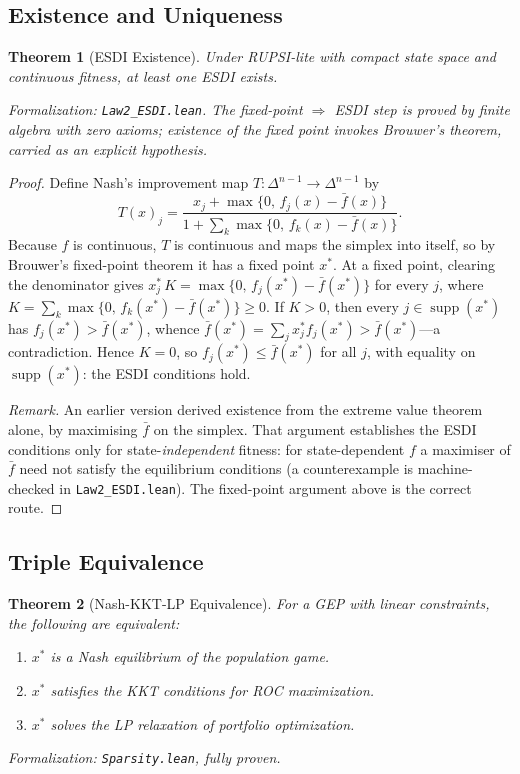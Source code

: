 \documentclass[12pt]{article}
\newtheorem{theorem}{Theorem}[section]
\begin{document}
\subsection{Existence and Uniqueness}

\begin{theorem}[ESDI Existence]
\label{thm:esdi-existence}
Under RUPSI-lite with compact state space and continuous fitness, at least one ESDI exists.
\end{theorem}
\noindent\textit{Formalization: \texttt{Law2\_ESDI.lean}. The fixed-point $\Rightarrow$ ESDI step is proved by finite algebra with zero axioms; existence of the fixed point invokes Brouwer's theorem, carried as an explicit hypothesis.}

\begin{proof}
Define Nash's improvement map $T : \Delta^{n-1} \to \Delta^{n-1}$ by
\[
T(x)_j = \frac{x_j + \max\{0,\, f_j(x) - \bar{f}(x)\}}{1 + \sum_k \max\{0,\, f_k(x) - \bar{f}(x)\}}.
\]
Because $f$ is continuous, $T$ is continuous and maps the simplex into itself, so by Brouwer's fixed-point theorem it has a fixed point $x^*$. At a fixed point, clearing the denominator gives $x^*_j\, K = \max\{0,\, f_j(x^*) - \bar{f}(x^*)\}$ for every $j$, where $K = \sum_k \max\{0,\, f_k(x^*) - \bar{f}(x^*)\} \geq 0$. If $K > 0$, then every $j \in \operatorname{supp}(x^*)$ has $f_j(x^*) > \bar{f}(x^*)$, whence $\bar{f}(x^*) = \sum_j x^*_j f_j(x^*) > \bar{f}(x^*)$---a contradiction. Hence $K = 0$, so $f_j(x^*) \leq \bar{f}(x^*)$ for all $j$, with equality on $\operatorname{supp}(x^*)$: the ESDI conditions hold.

\emph{Remark.} An earlier version derived existence from the extreme value theorem alone, by maximising $\bar{f}$ on the simplex. That argument establishes the ESDI conditions only for state-\emph{independent} fitness: for state-dependent $f$ a maximiser of $\bar{f}$ need not satisfy the equilibrium conditions (a counterexample is machine-checked in \texttt{Law2\_ESDI.lean}). The fixed-point argument above is the correct route.
\end{proof}

\subsection{Triple Equivalence}

\begin{theorem}[Nash-KKT-LP Equivalence]
\label{thm:triple-equivalence}
For a GEP with linear constraints, the following are equivalent:
\begin{enumerate}
    \item $x^*$ is a Nash equilibrium of the population game.
    \item $x^*$ satisfies the KKT conditions for ROC maximization.
    \item $x^*$ solves the LP relaxation of portfolio optimization.
\end{enumerate}
\end{theorem}
\noindent\textit{Formalization: \texttt{Sparsity.lean}, fully proven.}
\end{document}
